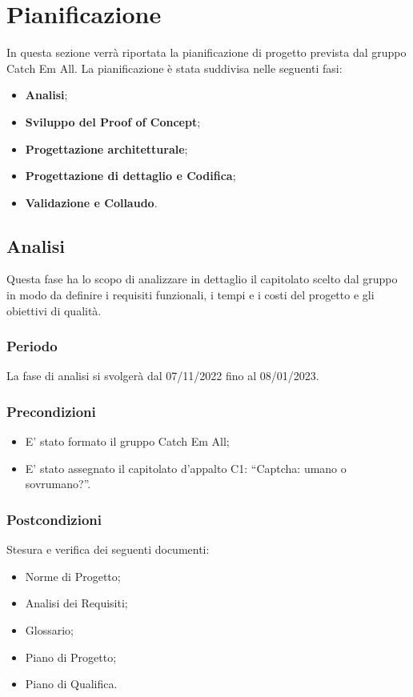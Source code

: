 \section{Pianificazione}
In questa sezione verrà riportata la pianificazione di progetto prevista dal gruppo Catch Em All. La pianificazione è stata suddivisa nelle seguenti fasi:
\begin{itemize}
	\item \textbf{Analisi};
	\item \textbf{Sviluppo del Proof of Concept};
	\item \textbf{Progettazione architetturale};
    \item \textbf{Progettazione di dettaglio e Codifica};
	\item \textbf{Validazione e Collaudo}.
\end{itemize}

\subsection{Analisi}
Questa fase ha lo scopo di analizzare in dettaglio il capitolato scelto dal gruppo in modo da definire i requisiti funzionali, i tempi e i costi del progetto e gli obiettivi di qualità.

\subsubsection{Periodo}
La fase di analisi si svolgerà dal 07/11/2022 fino al 08/01/2023.

\subsubsection{Precondizioni}
\begin{itemize}
	\item E’ stato formato il gruppo Catch Em All;
	\item E’ stato assegnato il capitolato d’appalto C1: “Captcha: umano o sovrumano?”.
\end{itemize}

\subsubsection{Postcondizioni}
Stesura e verifica dei seguenti documenti:
\begin{itemize}
	\item Norme di Progetto;
	\item Analisi dei Requisiti;
	\item Glossario;
    \item Piano di Progetto;
	\item Piano di Qualifica.
\end{itemize}

